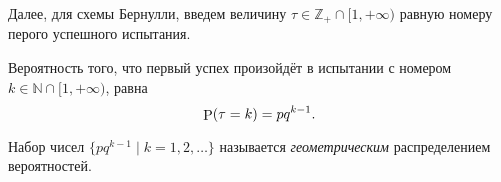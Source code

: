 Далее, для схемы Бернулли, введем величину $\tau \in \mathbb{Z}_+ \cap [1, +\infty)$ равную номеру перого успешного испытания. 

\begin{to_thr}[]
    Вероятность того, что первый успех произойдёт в испытании с номером $k \in \mathbb{N} \cap [1, +\infty)$, равна
    \begin{equation*}
        \P(\tau = k) = p q^{k-1}.
    \end{equation*}
\end{to_thr}

\begin{to_def}[$\mathfrak D$]
    Набор чисел $\{p q^{k-1} \mid k = 1, 2, \ldots\}$ называется \textit{геометрическим} распределением вероятностей.
\end{to_def}

